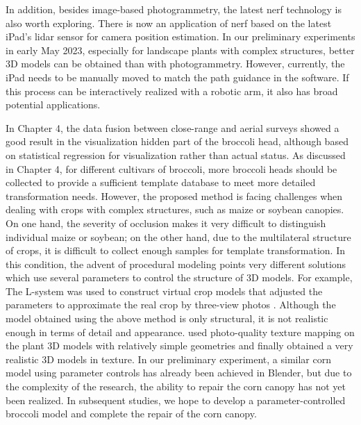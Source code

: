 In addition, besides image-based photogrammetry, the latest \gls{nerf} technology is also worth exploring. There is now an application of \gls{nerf} based on the latest iPad's \gls{lidar} sensor for camera position estimation. In our preliminary experiments in early May 2023, especially for landscape plants with complex structures, better 3D models can be obtained than with photogrammetry. However, currently, the iPad needs to be manually moved to match the path guidance in the software. If this process can be interactively realized with a robotic arm, it also has broad potential applications.

In Chapter 4, the data fusion between close-range and aerial surveys showed a good result in the visualization hidden part of the broccoli head, although based on statistical regression for visualization rather than actual status. As discussed in Chapter 4, for different cultivars of broccoli, more broccoli heads should be collected to provide a sufficient template database to meet more detailed transformation needs. However, the proposed method is facing challenges when dealing with crops with complex structures, such as maize or soybean canopies. On one hand, the severity of occlusion makes it very difficult to distinguish individual maize or soybean; on the other hand, due to the multilateral structure of crops, it is difficult to collect enough samples for template transformation. In this condition, the advent of procedural modeling points very different solutions which use several parameters to control the structure of 3D models. For example, The L-system was used to construct virtual crop models that adjusted the parameters to approximate the real crop by three-view photos \citep{cieslak_l-system_2021}. Although the model obtained using the above method is only structural, it is not realistic enough in terms of detail and appearance. \citet{mikami_hidden_2022} used photo-quality texture mapping on the plant 3D models with relatively simple geometries and finally obtained a very realistic 3D models in texture. In our preliminary experiment, a similar corn model using parameter controls has already been achieved in Blender, but due to the complexity of the research, the ability to repair the corn canopy has not yet been realized. In subsequent studies, we hope to develop a parameter-controlled broccoli model and complete the repair of the corn canopy.

